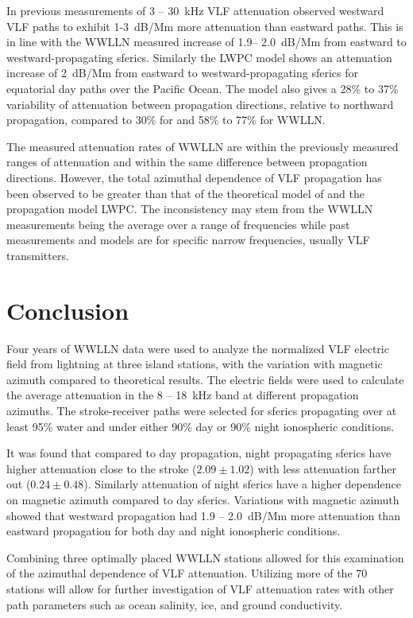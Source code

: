 In previous measurements of 3 -- 30~kHz VLF attenuation \citet{Taylor1960a} observed westward VLF paths to exhibit 1-3~dB/Mm more attenuation than eastward paths.
This is in line with the WWLLN measured increase of 1.9-- 2.0~dB/Mm from eastward to westward-propagating sferics.
Similarly the LWPC model shows an attenuation increase of 2~dB/Mm from eastward to westward-propagating sferics for equatorial day paths over the Pacific Ocean.
The model also gives a 28\% to 37\% variability of attenuation between propagation directions, relative to northward propagation, compared to 30\% for \citet{Wait1960a} and 58\% to 77\% for WWLLN.

The measured attenuation rates of WWLLN are within the previously measured ranges of attenuation and within the same difference between propagation directions.
However, the total azimuthal dependence of VLF propagation has been observed to be greater than that of the theoretical model of \citet{Wait1960a} and the propagation model LWPC.
The inconsistency may stem from the WWLLN measurements being the average over a range of frequencies while past measurements and models are for specific narrow frequencies, usually VLF transmitters.

\section{Conclusion}

Four years of WWLLN data were used to analyze the normalized VLF electric field from lightning at three island stations, with the variation with magnetic azimuth compared to theoretical results.
The electric fields were used to calculate the average attenuation in the 8 -- 18~kHz band at different propagation azimuths.
The stroke-receiver paths were selected for sferics propagating over at least 95\% water and under either 90\% day or 90\% night ionospheric conditions.

It was found that compared to day propagation, night propagating sferics have higher attenuation close to the stroke ($2.09 \pm 1.02$) with less attenuation farther out ($0.24 \pm 0.48$).
Similarly attenuation of night sferics have a higher dependence on magnetic azimuth compared to day sferics.
Variations with magnetic azimuth showed that westward propagation had 1.9 -- 2.0~dB/Mm more attenuation than eastward propagation for both day and night ionospheric conditions.

Combining three optimally placed WWLLN stations allowed for this examination of the azimuthal dependence of VLF attenuation.
Utilizing more of the 70 stations will allow for further investigation of VLF attenuation rates with other path parameters such as ocean salinity, ice, and ground conductivity.
